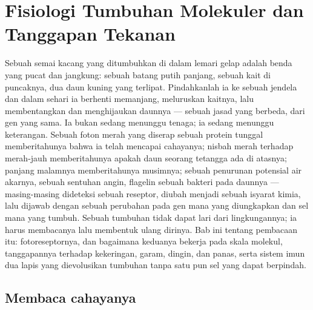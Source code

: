 \chapter{Fisiologi Tumbuhan Molekuler dan Tanggapan Tekanan}\label{ch:b3:plant-molecular-physiology}

Sebuah semai kacang yang ditumbuhkan di dalam lemari gelap adalah benda yang pucat dan
jangkung: sebuah batang putih panjang, sebuah kait di puncaknya, dua daun kuning yang terlipat. Pindahkanlah
ia ke sebuah jendela dan dalam sehari ia berhenti memanjang, meluruskan
kaitnya, lalu membentangkan dan menghijaukan daunnya --- sebuah jasad yang berbeda, dari
gen yang sama. Ia bukan sedang menunggu tenaga; ia sedang menunggu
keterangan. Sebuah foton merah yang diserap sebuah protein tunggal memberitahunya
bahwa ia telah mencapai cahayanya; nisbah merah terhadap merah-jauh memberitahunya
apakah daun seorang tetangga ada di atasnya; panjang malamnya memberitahunya
musimnya; sebuah penurunan potensial air akarnya, sebuah sentuhan
angin, flagelin sebuah bakteri pada daunnya --- masing-masing dideteksi sebuah
reseptor, diubah menjadi sebuah isyarat kimia, lalu dijawab dengan sebuah perubahan pada
gen mana yang diungkapkan dan sel mana yang tumbuh. Sebuah tumbuhan tidak dapat lari
dari lingkungannya; ia harus membacanya lalu membentuk ulang dirinya. Bab ini
tentang pembacaan itu: fotoreseptornya,  dan bagaimana keduanya
bekerja pada skala molekul, tanggapannya terhadap kekeringan, garam, dingin, dan
panas, serta sistem imun dua lapis yang dievolusikan tumbuhan tanpa
satu pun sel yang dapat berpindah.

\section{Membaca cahayanya}

